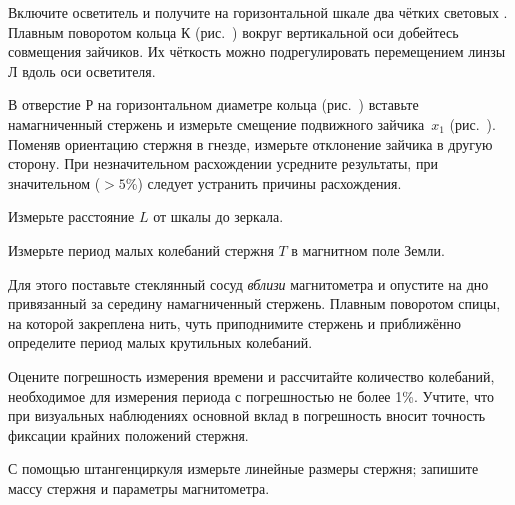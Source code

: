 \begin{lab:task}

\taskpreamble{~}
\vspace*{-8ex} %



        \item Включите осветитель и получите на горизонтальной шкале два чётких
световых . Плавным поворотом кольца К (рис.~)
        вокруг вертикальной оси добейтесь совмещения зайчиков.
        Их чёткость можно подрегулировать перемещением линзы Л вдоль оси
        осветителя.

        \item В отверстие Р на горизонтальном диаметре кольца
(рис.~) вставьте намагниченный стержень и измерьте смещение
подвижного зайчика~$x_1$ (рис.~).
Поменяв ориентацию стержня в гнезде, измерьте отклонение зайчика
в другую сторону. При незначительном расхождении усредните результаты,
при значительном ($>5$\%) следует устранить причины расхождения.

        \item Измерьте расстояние $L$ от шкалы до зеркала.

        \item Измерьте период малых колебаний стержня $T$ в магнитном поле Земли.

        Для этого поставьте стеклянный сосуд \emph{вблизи} магнитометра
        и опустите на дно привязанный за середину намагниченный стержень.
        Плавным поворотом спицы, на которой закреплена нить, чуть
        приподнимите стержень и приближённо определите период малых
        крутильных колебаний.

        Оцените погрешность измерения времени и рассчитайте количество
        колебаний, необходимое для измерения периода с погрешностью не более 1\%.
        Учтите, что при визуальных наблюдениях основной вклад
        в погрешность вносит точность фиксации крайних положений стержня.

        \item С помощью штангенциркуля измерьте линейные размеры стержня;
запишите массу стержня и параметры магнитометра.


\end{lab:task}
